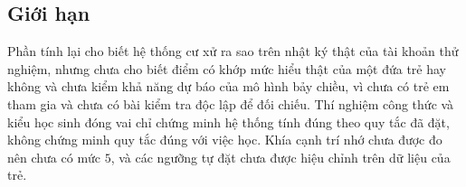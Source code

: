 \subsection{Giới hạn}
Phần tính lại cho biết hệ thống cư xử ra sao trên nhật ký thật của tài khoản thử nghiệm, nhưng chưa cho biết điểm có khớp mức hiểu thật của một đứa trẻ hay không và chưa kiểm khả năng dự báo của mô hình bảy chiều, vì chưa có trẻ em tham gia và chưa có bài kiểm tra độc lập để đối chiếu. Thí nghiệm công thức và kiểu học sinh đóng vai chỉ chứng minh hệ thống tính đúng theo quy tắc đã đặt, không chứng minh quy tắc đúng với việc học. Khía cạnh trí nhớ chưa được đo nên chưa có mức $5$, và các ngưỡng tự đặt chưa được hiệu chỉnh trên dữ liệu của trẻ.
